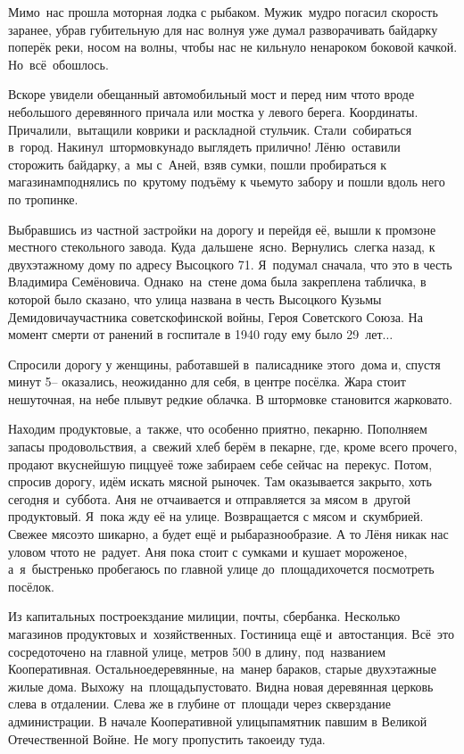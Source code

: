 Мимо~нас прошла моторная лодка с рыбаком. Мужик~мудро погасил скорость заранее, убрав губительную для нас волну\mdash я уже думал разворачивать байдарку поперёк реки, носом на волны, чтобы нас не кильнуло ненароком боковой качкой. Но~всё~обошлось. 

Вскоре увидели обещанный автомобильный мост и перед ним что\sdash то вроде небольшого деревянного причала или мостка у левого берега. Координаты\mdash \CoordsChagodoschaFifteenGoToStore. Причалили,~вытащили коврики и раскладной стульчик. Стали~собираться в~город. Накинул~штормовку\mdash надо выглядеть прилично! Лёню~оставили сторожить байдарку, а~мы с~Аней, взяв сумки, пошли пробираться к магазинам\mdash поднялись по~крутому подъёму к чьему\sdash то забору и пошли вдоль него по тропинке. 

Выбравшись из частной застройки на дорогу и перейдя её, вышли к промзоне местного стекольного завода. Куда~дальше\mdash не~ясно. Вернулись~слегка назад, к двухэтажному дому по адресу Высоцкого 71. Я~подумал сначала, что это в честь Владимира Семёновича. Однако~на~стене дома была закреплена табличка, в которой было сказано, что улица названа в честь Высоцкого Кузьмы Демидовича\mdash участника советско\sdash финской войны, Героя Советского Союза. На момент смерти от ранений в госпитале в 1940 году ему было 29~лет$\ldots$ 

Спросили дорогу у женщины, работавшей в~палисаднике этого~дома и, спустя минут 5\thinspace-- оказались, неожиданно для себя, в центре посёлка. Жара стоит нешуточная, на небе плывут редкие облачка. В штормовке становится жарковато. 

Находим продуктовые, а~также, что особенно приятно, пекарню. Пополняем запасы продовольствия, а~свежий хлеб берём в пекарне, где, кроме всего прочего, продают вкуснейшую пиццу\mdash её тоже забираем себе сейчас на~перекус. Потом, спросив дорогу, идём искать мясной рыночек. Там оказывается закрыто, хоть сегодня и~суббота. Аня не отчаивается и отправляется за мясом в~другой продуктовый. Я~пока жду её на улице. Возвращается с мясом и~скумбрией. Свежее мясо\mdash это шикарно, а будет ещё и рыба\mdash разнообразие. А то Лёня никак нас уловом что\sdash то не~радует. Аня пока стоит с сумками и кушает мороженое, а~я~быстренько пробегаюсь по главной улице до~площади\mdash хочется посмотреть посёлок.

Из капитальных построек\mdash здание милиции, почты, сбербанка. Несколько магазинов продуктовых и~хозяйственных. Гостиница ещё и~автостанция. Всё~это сосредоточено на главной улице, метров 500 в длину, под~названием Кооперативная. Остальное\mdash деревянные, на~манер бараков, старые двухэтажные жилые дома. Выхожу~на~площадь\mdash пустовато. Видна новая деревянная церковь слева в отдалении. Слева же в глубине от~площади через сквер\mdash здание администрации. В начале Кооперативной улицы\mdash памятник павшим в Великой Отечественной Войне. Не могу пропустить такое\mdash иду туда. 


